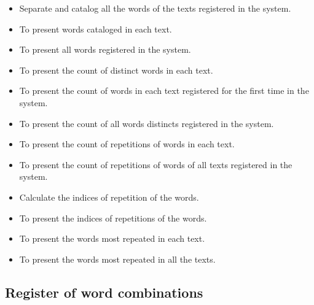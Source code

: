 \documentclass[11pt, twoside, a4paper]{book}
\begin{document}
				\begin{itemize}
					\item Separate and catalog all the words of the texts registered in the system.
				
					\item To present words cataloged in each text.
					\item To present all words registered in the system.

					\item To present the count of distinct words in each text.
					\item To present the count of words in each text registered for the first time in the system.
					\item To present the count of all words distincts registered in the system. 
				
					\item To present the count of repetitions of words in each text.
					\item To present the count of repetitions of words of all texts registered in the system.
				
					\item Calculate the indices of repetition of the words.
					\item To present the indices of repetitions of the words.
				
					\item To present the words most repeated in each text.
					\item To present the words most repeated in all the texts.
				\end{itemize}

			\subsection{Register of word combinations}
\end{document}
